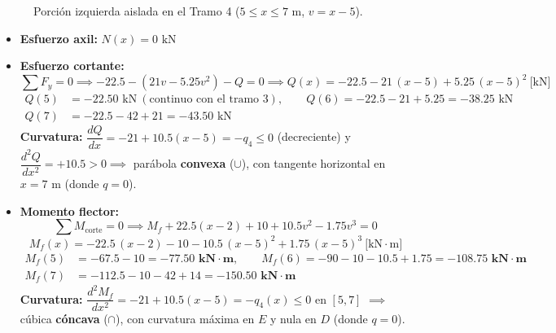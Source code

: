 \begin{figure}[H]
{%
    }
    \caption{Porción izquierda aislada en el Tramo 4 ($5 \le x \le 7\text{ m}$, $v = x - 5$).}
    \label{fig:ejemplo15_corte4}
\end{figure}

\begin{itemize}
    \item \textbf{Esfuerzo axil:} $\boxed{N(x) = 0\text{ kN}}$
    \item \textbf{Esfuerzo cortante:}
          \begin{equation}
              \sum F_y = 0 \implies -22.5 - (21v - 5.25v^2) - Q = 0 \implies \boxed{Q(x) = -22.5 - 21\,(x-5) + 5.25\,(x-5)^2 \ \text{[kN]}}
          \end{equation}
          \begin{align*}
              Q(5) & = -22.50\text{ kN} \ (\text{continuo con el tramo 3}), \qquad Q(6) = -22.5 - 21 + 5.25 = -38.25\text{ kN} \\
              Q(7) & = -22.5 - 42 + 21 = -43.50\text{ kN}
          \end{align*}
          \textbf{Curvatura:} $\dfrac{dQ}{dx} = -21 + 10.5(x-5) = -q_4 \le 0$ (decreciente) y $\dfrac{d^2Q}{dx^2} = +10.5 > 0 \implies$ parábola \textbf{convexa} ($\cup$), con tangente horizontal en $x = 7\text{ m}$ (donde $q = 0$).
    \item \textbf{Momento flector:}
          \begin{equation}
              \sum M_{\text{corte}} = 0 \implies M_f + 22.5(x-2) + 10 + 10.5v^2 - 1.75v^3 = 0
          \end{equation}
          \begin{equation}
              \boxed{M_f(x) = -22.5\,(x-2) - 10 - 10.5\,(x-5)^2 + 1.75\,(x-5)^3 \ \text{[kN}\cdot\text{m]}}
          \end{equation}
          \begin{align*}
              M_f(5) & = -67.5 - 10 = \mathbf{-77.50\text{ kN}\cdot\text{m}}, \qquad M_f(6) = -90 - 10 - 10.5 + 1.75 = \mathbf{-108.75\text{ kN}\cdot\text{m}} \\
              M_f(7) & = -112.5 - 10 - 42 + 14 = \mathbf{-150.50\text{ kN}\cdot\text{m}}
          \end{align*}
          \textbf{Curvatura:} $\dfrac{d^2M_f}{dx^2} = -21 + 10.5(x-5) = -q_4(x) \le 0$ en $[5, 7]$ $\implies$ cúbica \textbf{cóncava} ($\cap$), con curvatura máxima en $E$ y nula en $D$ (donde $q = 0$).
\end{itemize}


